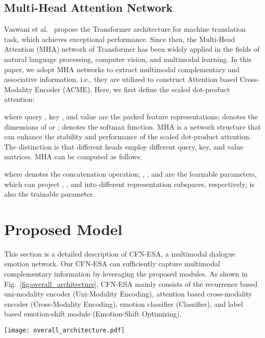 \documentclass[journal]{IEEEtran}
\begin{document}
\subsection{Multi-Head Attention Network}
Vaswani et al.~\cite{vaswani2017attention} propose the Transformer architecture for machine translation task, which achieves exceptional performance. Since then, the Multi-Head Attention (MHA) network of Transformer has been widely applied in the fields of natural language processing, computer vision, and multimodal learning. In this paper, we adopt MHA networks to extract multimodal complementary and associative information, i.e., they are utilized to construct Attention based Cross-Modality Encoder (ACME). Here, we first define the scaled dot-product attention:

where query , key , and value  are the packed feature representations;  denotes the dimensions of  or ;  denotes the softmax function. MHA is a network structure that can enhance the stability and performance of the scaled dot-product attention. The distinction is that different heads employ different query, key, and value matrices. MHA can be computed as follows:

where  denotes the concatenation operation; , , and  are the learnable parameters, which can project , , and  into different representation subspaces, respectively;  is also the trainable parameter.

\section{Proposed Model}\label{model}
This section is a detailed description of CFN-ESA, a multimodal dialogue emotion network. Our CFN-ESA can sufficiently capture multimodal complementary information by leveraging the proposed modules. As shown in Fig.~\ref{fig:overall_architecture}, CFN-ESA mainly consists of the recurrence based uni-modality encoder (Uni-Modality Encoding), attention based cross-modality encoder (Cross-Modality Encoding), emotion classifier (Classifier), and label based emotion-shift module (Emotion-Shift Optimizing).
\begin{figure*}[htbp]
    \centering
    \texttt{[image: overall\_architecture.pdf]}
    \caption{The overall architecture of our CFN-ESA. First, the utterance-level features of visual, textual, and acoustic modalities are extracted by DenseNet, RoBERTa, and OpenSmile, respectively; second, the intra-modal contextual information and inter-modal complementary information are captured by uni-modality encoder and cross-modality encoder, in that order; then, the optimization of the utterance expression is performed by utilizing the emotion-shift module; finally, the emotion classifier is adopted for prediction.}
    \label{fig:overall_architecture}
\end{figure*}
\end{document}
